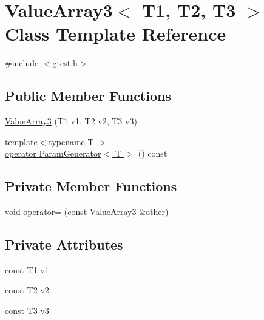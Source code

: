 \hypertarget{classtesting_1_1internal_1_1ValueArray3}{\section{\-Value\-Array3$<$ \-T1, \-T2, \-T3 $>$ \-Class \-Template \-Reference}
\label{d4/dfe/classtesting_1_1internal_1_1ValueArray3}
}


{\ttfamily \#include $<$gtest.\-h$>$}

\subsection*{\-Public \-Member \-Functions}
\begin{DoxyCompactItemize}
\item 
\hyperlink{classtesting_1_1internal_1_1ValueArray3_a92bb9591fb58817dbd3fb7c751feab36}{\-Value\-Array3} (\-T1 v1, \-T2 v2, \-T3 v3)
\item 
{\footnotesize template$<$typename T $>$ }\\\hyperlink{classtesting_1_1internal_1_1ValueArray3_a08ef46fa12c9dd8ef6fc630baeea89b7}{operator Param\-Generator$<$ T $>$} () const 
\end{DoxyCompactItemize}
\subsection*{\-Private \-Member \-Functions}
\begin{DoxyCompactItemize}
\item 
void \hyperlink{classtesting_1_1internal_1_1ValueArray3_a8539fea847e69fa12136bc90e04a47ad}{operator=} (const \hyperlink{classtesting_1_1internal_1_1ValueArray3}{\-Value\-Array3} \&other)
\end{DoxyCompactItemize}
\subsection*{\-Private \-Attributes}
\begin{DoxyCompactItemize}
\item 
const \-T1 \hyperlink{classtesting_1_1internal_1_1ValueArray3_aac1d0654cc6c1aceb4a5d0fa7a98042e}{v1\-\_\-}
\item 
const \-T2 \hyperlink{classtesting_1_1internal_1_1ValueArray3_a9f0a8ce6ce2fd27e980c4c51a7a7256a}{v2\-\_\-}
\item 
const \-T3 \hyperlink{classtesting_1_1internal_1_1ValueArray3_a4f8257321a2eab0456239174d6712d5e}{v3\-\_\-}
\end{DoxyCompactItemize}


